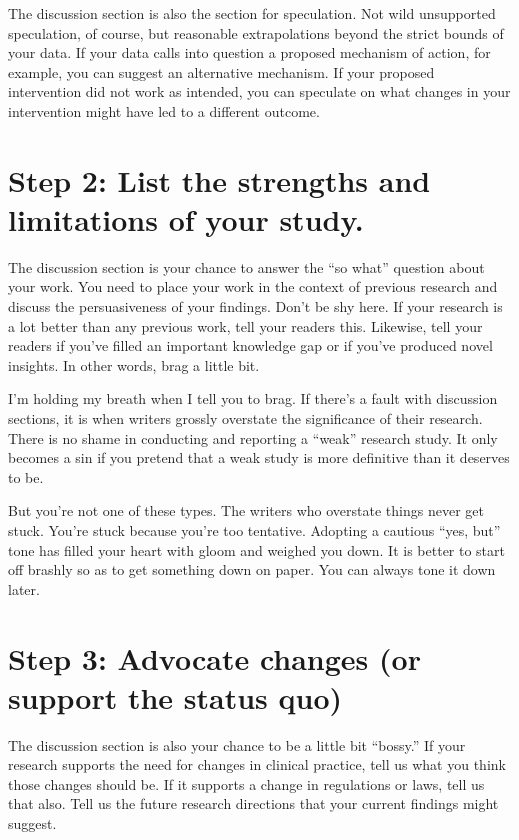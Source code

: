 \documentclass[
  letterpaper,
  DIV=11,
  numbers=noendperiod]{scrreprt}
\begin{document}
\begin{tcolorbox}
The discussion section is also the section for speculation. Not wild
unsupported speculation, of course, but reasonable extrapolations beyond
the strict bounds of your data. If your data calls into question a
proposed mechanism of action, for example, you can suggest an
alternative mechanism. If your proposed intervention did not work as
intended, you can speculate on what changes in your intervention might
have led to a different outcome.

\section{Step 2: List the strengths and limitations of your
study.}\label{step-2-list-the-strengths-and-limitations-of-your-study.}

The discussion section is your chance to answer the ``so what'' question
about your work. You need to place your work in the context of previous
research and discuss the persuasiveness of your findings. Don't be shy
here. If your research is a lot better than any previous work, tell your
readers this. Likewise, tell your readers if you've filled an important
knowledge gap or if you've produced novel insights. In other words, brag
a little bit.

I'm holding my breath when I tell you to brag. If there's a fault with
discussion sections, it is when writers grossly overstate the
significance of their research. There is no shame in conducting and
reporting a ``weak'' research study. It only becomes a sin if you
pretend that a weak study is more definitive than it deserves to be.

But you're not one of these types. The writers who overstate things
never get stuck. You're stuck because you're too tentative. Adopting a
cautious ``yes, but'' tone has filled your heart with gloom and weighed
you down. It is better to start off brashly so as to get something down
on paper. You can always tone it down later.

\section{Step 3: Advocate changes (or support the status
quo)}\label{step-3-advocate-changes-or-support-the-status-quo}

The discussion section is also your chance to be a little bit ``bossy.''
If your research supports the need for changes in clinical practice,
tell us what you think those changes should be. If it supports a change
in regulations or laws, tell us that also. Tell us the future research
directions that your current findings might suggest.


\end{tcolorbox}
\end{document}
